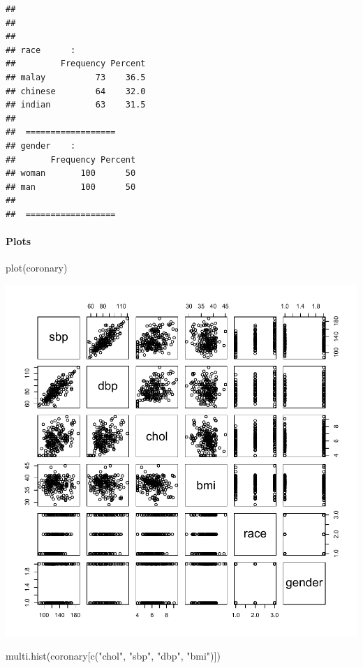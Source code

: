 \documentclass[
]{book}
\makeatletter
\newenvironment{Shaded}{\begin{snugshade}}{\end{snugshade}}
\newcommand{\FunctionTok}[1]{\textcolor[rgb]{0,0,0}{#1}}
\newcommand{\NormalTok}[1]{#1}
\newcommand{\StringTok}[1]{\textcolor[rgb]{0.5,0.5,0.5}{#1}}
\newenvironment{kframe}{%
\medskip{}
\setlength{\fboxsep}{.8em}
 \def\at@end@of@kframe{}%
 \ifinner\ifhmode%
  \def\at@end@of@kframe{\end{minipage}}%
  \begin{minipage}{\columnwidth}%
 \fi\fi%
 \def\FrameCommand##1{\hskip\@totalleftmargin \hskip-\fboxsep
 \colorbox{shadecolor}{##1}\hskip-\fboxsep
     \hskip-\linewidth \hskip-\@totalleftmargin \hskip\columnwidth}%
 \MakeFramed {\advance\hsize-\width
   \@totalleftmargin\z@ \linewidth\hsize
   \@setminipage}}%
 {\par\unskip\endMakeFramed%
 \at@end@of@kframe}
\renewenvironment{Shaded}{\begin{kframe}}{\end{kframe}}
\makeatother
\begin{document}
\begin{verbatim}
## 
##  
##  
## race      :    
##         Frequency Percent
## malay          73    36.5
## chinese        64    32.0
## indian         63    31.5
## 
##  ================== 
## gender    :    
##       Frequency Percent
## woman       100      50
## man         100      50
## 
##  ==================
\end{verbatim}

\hypertarget{plots-1}{%
\paragraph{Plots}\label{plots-1}}

\begin{Shaded}
\begin{Highlighting}[]
\FunctionTok{plot}\NormalTok{(coronary)}
\end{Highlighting}
\end{Shaded}

\begin{center}\includegraphics[width=0.7\linewidth,keepaspectratio]{Multivariable_Data_Analysis_files/figure-latex/unnamed-chunk-109-1} \end{center}

\begin{Shaded}
\begin{Highlighting}[]
\FunctionTok{multi.hist}\NormalTok{(coronary[}\FunctionTok{c}\NormalTok{(}\StringTok{"chol"}\NormalTok{, }\StringTok{"sbp"}\NormalTok{, }\StringTok{"dbp"}\NormalTok{, }\StringTok{"bmi"}\NormalTok{)])}
\end{Highlighting}
\end{Shaded}
\end{document}
